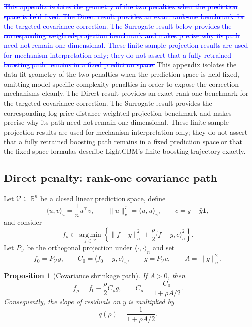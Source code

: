\documentclass[10pt]{article}
\newtheorem{proposition}{Proposition}
\theoremstyle{definition}
\newcommand{\R}{\mathbb{R}}
\newcommand{\1}{\mathbf{1}}
\newcommand{\Vcal}{\mathcal{V}}
\newcommand{\argminop}{\operatorname*{arg\,min}}
\newcommand{\oldtext}[1]{\textcolor{blue}{\sout{#1}}}
\newcommand{\newtext}[1]{\textcolor{impGreen}{#1}}
\begin{document}
\oldtext{This appendix isolates the geometry of the two penalties when the prediction space is held fixed. The Direct result provides an exact rank-one benchmark for the targeted covariance correction. The Surrogate result below provides the corresponding weighted-projection benchmark and makes precise why its path need not remain one-dimensional. These finite-sample projection results are used for mechanism interpretation only; they do not assert that a fully retrained boosting path remains in a fixed prediction space.}
\newtext{This appendix isolates the data-fit geometry of the two penalties when the prediction space is held fixed, omitting model-specific complexity penalties in order to expose the correction mechanisms cleanly. The Direct result provides an exact rank-one benchmark for the targeted covariance correction. The Surrogate result provides the corresponding log-price-distance-weighted projection benchmark and makes precise why its path need not remain one-dimensional. These finite-sample projection results are used for mechanism interpretation only; they do not assert that a fully retrained boosting path remains in a fixed prediction space or that the fixed-space formulas describe LightGBM's finite boosting trajectory exactly.}

\subsection{\newtext{Direct penalty: rank-one covariance path}}

Let $\Vcal\subseteq\R^n$ be a closed linear prediction space, define
\[
\langle u,v\rangle_n=\frac{1}{n}u^\top v,
\qquad
\|u\|_n^2=\langle u,u\rangle_n,
\qquad
c=y-\bar y\1,
\]
and consider
\begin{equation}
\label{eq:path_problem}
f_\rho\in\argminop_{f\in\Vcal}
\left\{
\|f-y\|_n^2
+\frac{\rho}{2}\langle f-y,c\rangle_n^2
\right\}.
\end{equation}
Let $P_{\Vcal}$ be the orthogonal projection under $\langle\cdot,\cdot\rangle_n$ and set
\[
f_0=P_{\Vcal}y,\qquad
C_0=\langle f_0-y,c\rangle_n,\qquad
g=P_{\Vcal}c,\qquad
A=\|g\|_n^2.
\]

\begin{proposition}[Covariance shrinkage path]
\label{prop:path}
If $A>0$, then
\[
f_\rho=f_0-\frac{\rho}{2}C_\rho g,
\qquad
C_\rho=\frac{C_0}{1+\rho A/2}.
\]
Consequently, the slope of residuals on $y$ is multiplied by
\[
q(\rho)=\frac{1}{1+\rho A/2}.
\]
\end{proposition}
\end{document}
